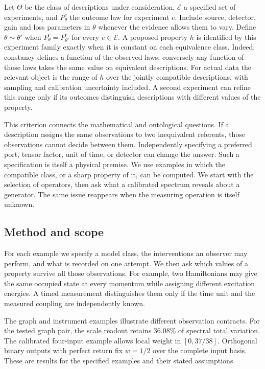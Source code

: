 \documentclass[11pt,letterpaper]{article}
\begin{document}
Let $\Theta$ be the class of descriptions under consideration, $\mathcal E$ a specified set of experiments, and $P_\theta^e$ the outcome law for experiment $e$. Include source, detector, gain and loss parameters in $\theta$ whenever the evidence allows them to vary. Define $\theta\sim\theta'$ when $P_\theta^e=P_{\theta'}^e$ for every $e\in\mathcal E$. A proposed property $h$ is identified by this experiment family exactly when it is constant on each equivalence class. Indeed, constancy defines a function of the observed laws; conversely any function of those laws takes the same value on equivalent descriptions. For actual data the relevant object is the range of $h$ over the jointly compatible descriptions, with sampling and calibration uncertainty included. A second experiment can refine this range only if its outcomes distinguish descriptions with different values of the property.

This criterion connects the mathematical and ontological questions. If a description assigns the same observations to two inequivalent referents, those observations cannot decide between them. Independently specifying a preferred port, tensor factor, unit of time, or detector can change the answer. Such a specification is itself a physical premise. We use examples in which the compatible class, or a sharp property of it, can be computed. We start with the selection of operators, then ask what a calibrated spectrum reveals about a generator. The same issue reappears when the measuring operation is itself unknown.

\clearpage

\clearpage
\subsection*{Method and scope}
For each example we specify a model class, the interventions an observer may perform, and what is recorded on one attempt. We then ask which values of a property survive all those observations. For example, two Hamiltonians may give the same occupied state at every momentum while assigning different excitation energies. A timed measurement distinguishes them only if the time unit and the measured coupling are independently known.

The graph and instrument examples illustrate different observation contracts. For the tested graph pair, the scale readout retains 36.08\% of spectral total variation. The calibrated four-input example allows local weight in $[0,37/38]$. Orthogonal binary outputs with perfect return fix $w=1/2$ over the complete input basis. These are results for the specified examples and their stated assumptions.
\end{document}

